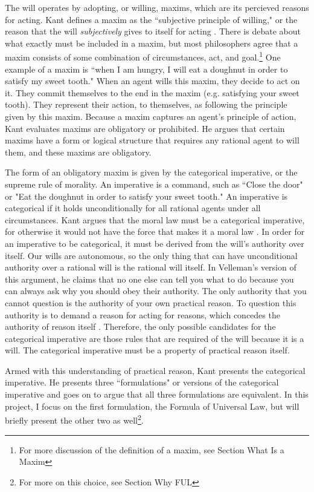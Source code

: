 \begin{isabellebody}
\begin{isamarkuptext}
The will operates by adopting, or willing, maxims, which are its percieved reasons for acting. Kant defines a maxim as 
the ``subjective principle of willing," or the reason that the will \emph{subjectively} gives 
to itself for acting \cite[16 footnote 1]{groundwork}. There is debate about what exactly must be 
included in a maxim, but most philosophers agree that a maxim consists of some combination of circumstances, 
act, and goal.\footnote{For more discussion of the definition of a maxim, see Section What Is a Maxim}
One example of a maxim is ``when I am hungry, I will eat a doughnut in order to satisfy my sweet tooth." 
When an agent wills this maxim, they decide to act on it. They commit themselves to the end in the maxim 
(e.g. satisfying your sweet tooth). They represent their action, to themselves, as following the 
principle given by this maxim. Because a maxim captures an agent's principle of action, Kant evaluates
maxims are obligatory or prohibited. He argues that certain maxims have a form or logical structure 
that requires any rational agent to will them, and these maxims are obligatory. 

The form of an obligatory maxim is given by the categorical imperative, or the supreme rule of morality. 
An imperative is a command, such as ``Close the door" or "Eat the doughnut in order to satisfy your 
sweet tooth." An imperative is categorical if it holds unconditionally for all rational agents under all 
circumstances. Kant argues that the moral law must be a categorical imperative, for otherwise it would 
not have the force that makes it a moral law \cite[5]{groundwork}. In order for an imperative to be 
categorical, it must be derived from the will's authority over itself. Our wills are autonomous, so 
the only thing that can have unconditional authority over a rational will is 
the rational will itself. In Velleman's version of this argument, he claims that no one else can tell you what 
to do because you can always ask why you 
should obey their authority. The only authority that you cannot question is the authority of your own 
practical reason. To question this authority is to demand a reason for acting for reasons, which 
concedes the authority of reason itself \cite[23]{velleman}. Therefore, the only possible candidates 
for the categorical imperative are those rules that are required of the will because it is a will. 
The categorical imperative must be a property of practical reason itself.

Armed with this understanding of practical reason, Kant presents the categorical 
imperative. He presents three ``formulations" or versions of the categorical imperative and goes on to 
argue that all three formulations are equivalent. In this project, I focus on the first formulation,
the Formula of Universal Law, but will briefly present the other two as well\footnote{For more on this 
choice, see Section Why FUL}. 


\end{isamarkuptext}
\end{isabellebody}
